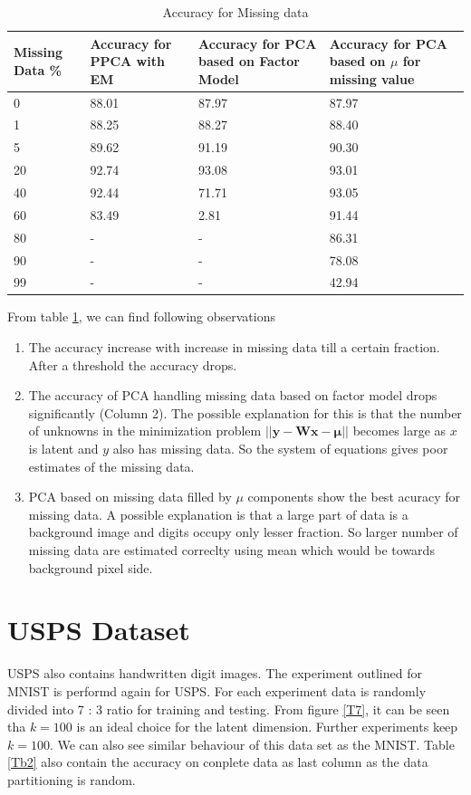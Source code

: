 \newpage

\begin{table}
\begin{center}
\begin{tabular}{ |p{3cm}|p{3cm}|p{3cm}|p{3cm}|  }
 \hline
 Missing Data \% & Accuracy for PPCA with EM & Accuracy for PCA based on Factor Model & Accuracy for PCA based on $\mu$ for missing value\\
 \hline
 \hline
 	0 & 88.01 & 87.97 & 87.97\\
 	1 & 88.25 & 88.27 & 88.40\\ 
	5 & 89.62 & 91.19 & 90.30\\ 
	20 & 92.74 & 93.08 & 93.01\\
	40 & 92.44 & 71.71 & 93.05\\
	60 & 83.49 & 2.81 & 91.44\\
	80 & - & - & 86.31\\
	90 & - & - & 78.08\\
	99 & - & - & 42.94\\
 \hline
\end{tabular}
\end{center}
\caption{Accuracy for Missing data}
\label{Tb1}
\end{table}
	
From table \ref{Tb1}, we can find following observations
\begin{enumerate}
\item The accuracy increase with increase in missing data till a certain fraction. After a threshold the accuracy drops. 
\item The accuracy of PCA handling missing data based on factor model drops significantly (Column 2). The possible explanation for this is that the number of unknowns in the minimization problem $\mathbf{||y-Wx-\mu||}$ becomes large as $x$ is latent and $y$ also has missing data. So the system of equations gives poor estimates of the missing data.
\item PCA based on missing data filled by $\mu$ components show the best acuracy for missing data. A possible explanation is that a large part of data is a background image and digits occupy only lesser fraction. So larger number of missing data are estimated correclty using mean which would be towards background pixel side.
\end{enumerate}

\section{USPS Dataset}
USPS also contains handwritten digit images. The experiment outlined for MNIST is performd again for USPS. For each experiment data is randomly divided into 7 : 3 ratio for training and testing. From figure \ref{T7}, it can be seen tha $k = 100$ is an ideal choice for the latent dimension. Further experiments keep $k=100$. We can also see similar behaviour of this data set as the MNIST. Table \ref{Tb2} also contain the accuracy on conplete data as last column as the data partitioning is random.

